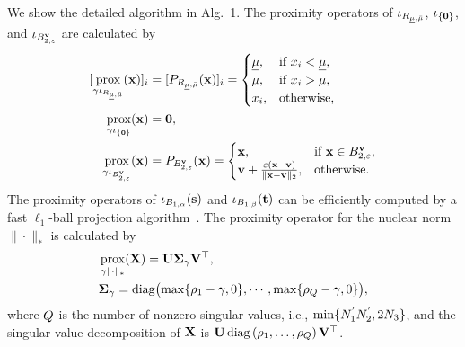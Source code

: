 \documentclass[10pt,journal]{IEEEtran}
\DeclareMathOperator{\prox}{prox}
\DeclareMathOperator{\diag}{diag}
\begin{document}
We show the detailed algorithm in Alg.~1.
The proximity operators of $\iota_{R_{\underline{\mu},\bar{\mu}}}$, $\iota_{\{ \mathbf{0} \}}$, and  $\iota_{B_{2, \varepsilon}^{\mathbf{v}}}$ are calculated by
\begin{align}
    \label{eq:prox_box_constraint}
    \lbrack \prox_{\ParamStepsize{} \FuncIndicator{\SetRange}} (\VarOne) \rbrack_{i} 
    &= \lbrack \Projection{\SetRange} (\VarOne) \rbrack_{i} =
    \begin{cases} 
            \MinRange, & \text{if } \ElementOne{i} < \MinRange, \\ 
            \MaxRange, & \text{if } \ElementOne{i}> \MaxRange, \\ 
            \ElementOne{i}, & \text{otherwise,} 
    \end{cases} \\
    \label{eq:prox_zeroset}
    \prox_{\gamma \FuncIndicator{\SetZero}}(\VarOne) &= \mathbf{0}, \\
    \label{eq:prox_l2ball_constraint}
    \prox_{\gamma \FuncIndicator{\BallFidel}}(\VarOne) &= \Projection{\BallFidel} (\VarOne) = 
    \begin{cases}
        \VarOne, & \text{if } \VarOne \in \BallFidel, \\ 
        \HSIObsv + \frac{\varepsilon (\VarOne - \HSIObsv)}{\| \VarOne - \HSIObsv \|_2}, & \text{otherwise.}
    \end{cases}
\end{align}
The proximity operators of $\iota_{B_{1, \alpha}} (\mathbf{s})$ and $\iota_{B_{1, \beta}} (\mathbf{t})$ can be efficiently computed by a fast $\ell_{1}$-ball projection algorithm~\cite{L1ball2016}.
The proximity operator for the nuclear norm $\| \cdot \|_{*}$ is calculated by
\begin{align}
	\label{eq:prox_nuclear_norm}
	& \prox_{\ParamStepsize{} \| \cdot \|_{*}} (\MatrixOne) 
	= \LeftSingularMatrix \SingularMatrix{\ParamStepsize{}} \RightSingularMatrixT, \notag \\
	& \SingularMatrix{\ParamStepsize{}}
	= \diag \bigl( \max \{ \SingularValue{1} - \ParamStepsize{}, 0\}, \cdots, \max \{ \SingularValue{\NumSingularValue} - \ParamStepsize{}, 0 \} \bigr),
\end{align}
where $Q$ is the number of nonzero singular values, i.e., $\min \{N_{1}^{'} N_{2}^{'}, 2 N_{3} \}$, and the singular value decomposition of $\mathbf{X}$ is $\LeftSingularMatrix \diag \left( \SingularValue{1}, \ldots, \SingularValue{\NumSingularValue} \right) \RightSingularMatrixT$.
\end{document}
